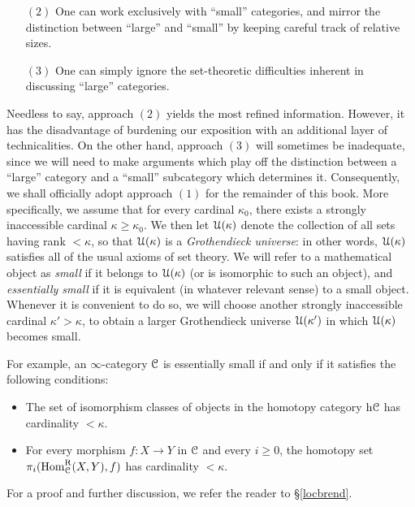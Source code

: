 \begin{1.2.15 Set-Theoretic Technicalities}
\begin{itemize}
\item[$(2)$] One can work exclusively with ``small'' categories, and
mirror the distinction between ``large'' and ``small'' by keeping
careful track of relative sizes.

 \item[$(3)$] One can simply ignore the set-theoretic difficulties
 inherent in discussing ``large'' categories.

\end{itemize}

Needless to say, approach $(2)$ yields the most refined information. However, it has the disadvantage of burdening our exposition with an additional layer of technicalities. On the other hand, approach $(3)$ will sometimes be inadequate, since we will need to make arguments which play off the distinction between a ``large'' category and a ``small'' subcategory which determines it. Consequently, we shall officially adopt approach $(1)$ for the remainder of this book. More specifically, we assume that for every
cardinal $\kappa_0$, there exists a strongly inaccessible cardinal $\kappa \geq \kappa_0$.
We then let $\operatorname{\mathcal{U}}(\kappa)$ denote the collection of all sets having rank $< \kappa$, so that
$\operatorname{\mathcal{U}}(\kappa)$ is a {\it Grothendieck universe}: in other words, $\operatorname{\mathcal{U}}(\kappa)$ satisfies all of the usual axioms of set theory. We will refer to a mathematical object as {\it small} if it belongs to $\operatorname{\mathcal{U}}(\kappa)$ (or is isomorphic to such an object), and {\it essentially small} if it is equivalent (in whatever relevant sense) to a small object. Whenever it is convenient to do so, we will choose another strongly inaccessible cardinal $\kappa' > \kappa$, to obtain a larger Grothendieck universe
$\operatorname{\mathcal{U}}(\kappa')$ in which $\operatorname{\mathcal{U}}(\kappa)$ becomes small.

For example, an $\infty$-category $\operatorname{\mathcal{C}}$ is essentially small if and only if it satisfies the following conditions:
\begin{itemize}
\item The set of isomorphism classes of objects in the homotopy
category $\rm{h} \it{\operatorname{\mathcal{C}}}$ has cardinality $< \kappa$.

\item For every morphism $f: X \rightarrow Y$ in $\operatorname{\mathcal{C}}$ and every $i \geq 0$, the homotopy
set $\pi_{i}( \operatorname{Hom}^{\operatorname{R}}_{\operatorname{\mathcal{C}}}(X,Y), f)$ has cardinality $< \kappa$.
\end{itemize}

For a proof and further discussion, we refer the reader to \S \ref{locbrend}.


\end{1.2.15 Set-Theoretic Technicalities}
